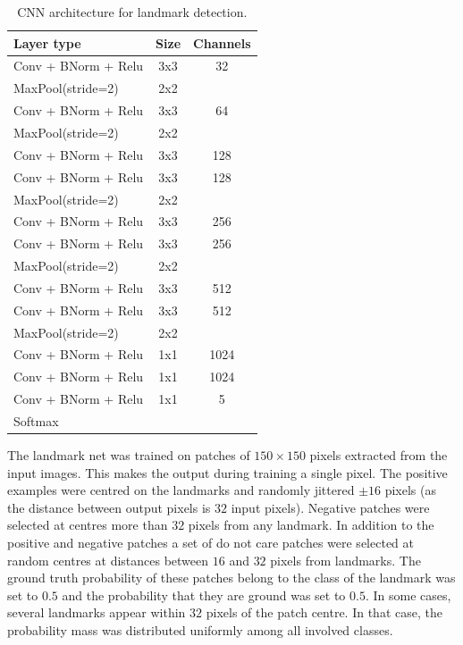 \documentclass[10pt,a4paper,twocolumn]{article}
\begin{document}
\begin{table}
\begin{center}
\begin{tabular}{|l|c|c|}
\hline
\textbf{Layer type} & \textbf{Size} & \textbf{Channels} \\
\hline

Conv + BNorm + Relu & 3x3 & 32 \\
MaxPool(stride=2) & 2x2 &  \\
\hline

Conv + BNorm + Relu & 3x3 & 64 \\
MaxPool(stride=2) & 2x2 &  \\
\hline

Conv + BNorm + Relu & 3x3 & 128 \\
Conv + BNorm + Relu & 3x3 & 128 \\
MaxPool(stride=2) & 2x2 &  \\
\hline

Conv + BNorm + Relu & 3x3 & 256 \\
Conv + BNorm + Relu & 3x3 & 256 \\
MaxPool(stride=2) & 2x2 &  \\
\hline

Conv + BNorm + Relu & 3x3 & 512 \\
Conv + BNorm + Relu & 3x3 & 512 \\
MaxPool(stride=2) & 2x2 &  \\
\hline

Conv + BNorm + Relu & 1x1 & 1024 \\
Conv + BNorm + Relu & 1x1 & 1024 \\
Conv + BNorm + Relu & 1x1 & 5 \\
Softmax & & \\
\hline

\end{tabular}
\end{center}
\caption{CNN architecture for landmark detection. 
}
\label{tab:cownet}
\end{table}

The landmark net was trained on patches of $150\times 150$ pixels extracted from the input images. This makes the output during training a single pixel. The positive examples were centred on the landmarks and randomly jittered $\pm 16$ pixels (as the distance between output pixels is $32$ input pixels). Negative patches were selected at centres more than $32$ pixels from any landmark. In addition to the positive and negative patches a set of do not care patches were selected at random centres at distances between $16$ and $32$ pixels from landmarks. The ground truth probability of these patches belong to the class of the landmark was set to $0.5$ and the probability that they are ground was set to $0.5$. In some cases, several landmarks appear within $32$ pixels of the patch centre. In that case, the probability mass was distributed uniformly among all involved classes.
\end{document}
